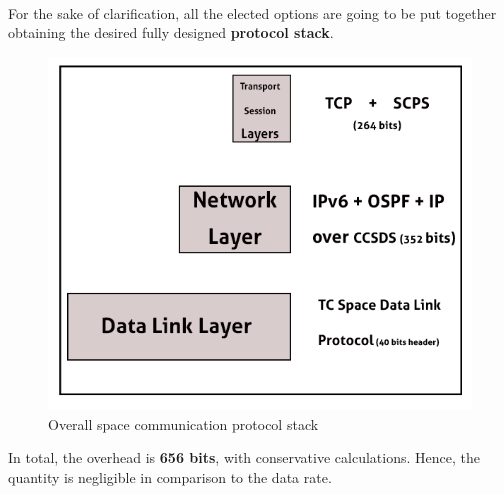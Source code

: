 \paragraph{}

For the sake of clarification, all the elected options are going to be put together obtaining the desired fully designed \textbf{protocol stack}.

\begin{figure}[H]
\centering
\includegraphics[scale=0.8]{./sections/CommunicationsDept/results2}
\caption{Overall space communication protocol stack }
\label{fig:osi}
\end{figure}

In total, the overhead is \textbf{656 bits}, with conservative calculations. Hence, the quantity is negligible in comparison to the data rate. 